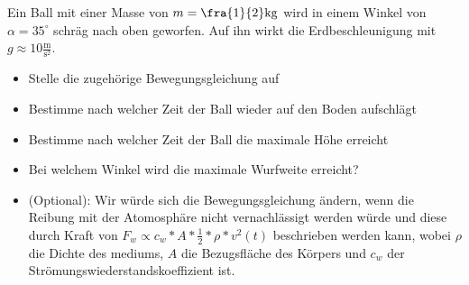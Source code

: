 
Ein Ball mit einer Masse von $m=\fra{1}{2}\text{kg}$ wird in einem Winkel von
$\alpha=35^\circ$ schräg nach oben geworfen. Auf ihn wirkt die Erdbeschleunigung
mit $g\approx10\frac{\text{m}}{\text{s}^2}$.

\begin{itemize}
	\item Stelle die zugehörige Bewegungsgleichung auf
	\item Bestimme nach welcher Zeit der Ball wieder auf den Boden aufschlägt
	\item Bestimme nach welcher Zeit der Ball die maximale Höhe erreicht
	\item Bei welchem Winkel wird die maximale Wurfweite erreicht?
	\item (Optional): Wir würde sich die Bewegungsgleichung ändern, wenn die Reibung
		mit der Atomosphäre nicht vernachlässigt werden würde und diese
		durch Kraft von $F_w \propto c_w * A * \frac{1}{2} * \rho * v^2(t)$ beschrieben
		werden kann, wobei $\rho$ die Dichte des mediums, $A$ die Bezugsfläche des Körpers
		und $c_w$ der Strömungswiederstandskoeffizient ist.
\end{itemize}